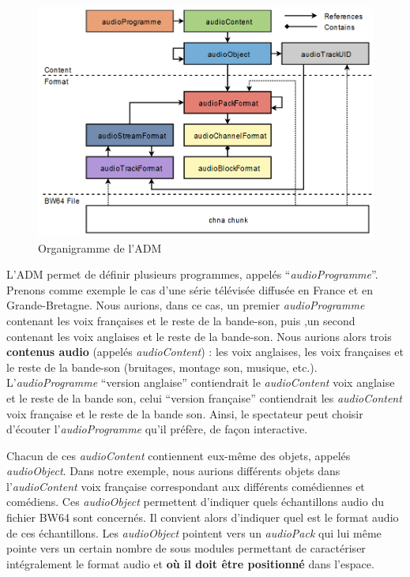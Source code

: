 \documentclass[
  letterpaper,
  DIV=11,
  numbers=noendperiod]{scrreprt}
\begin{document}
\begin{figure}

{\centering \includegraphics{spatialisation/../_resources/bitmap/adm/admStruct.png}

}

\caption{\label{fig-adm-struct}Organigramme de l'ADM}

\end{figure}

L'ADM permet de définir plusieurs programmes, appelés
``\emph{audioProgramme}''. Prenons comme exemple le cas d'une série
télévisée diffusée en France et en Grande-Bretagne. Nous aurions, dans
ce cas, un premier \emph{audioProgramme} contenant les voix françaises
et le reste de la bande-son, puis ,un second contenant les voix
anglaises et le reste de la bande-son. Nous aurions alors trois
\textbf{contenus audio} (appelés \emph{audioContent}) : les voix
anglaises, les voix françaises et le reste de la bande-son (bruitages,
montage son, musique, etc.). L'\emph{audioProgramme} ``version
anglaise'' contiendrait le \emph{audioContent} voix anglaise et le reste
de la bande son, celui ``version française'' contiendrait les
\emph{audioContent} voix française et le reste de la bande son. Ainsi,
le spectateur peut choisir d'écouter l'\emph{audioProgramme} qu'il
préfère, de façon interactive.

Chacun de ces \emph{audioContent} contiennent eux-même des objets,
appelés \emph{audioObject}. Dans notre exemple, nous aurions différents
objets dans l'\emph{audioContent} voix française correspondant aux
différents comédiennes et comédiens. Ces \emph{audioObject} permettent
d'indiquer quels échantillons audio du fichier BW64 sont concernés. Il
convient alors d'indiquer quel est le format audio de ces échantillons.
Les \emph{audioObject} pointent vers un \emph{audioPack} qui lui même
pointe vers un certain nombre de sous modules permettant de caractériser
intégralement le format audio et \textbf{où il doit être positionné}
dans l'espace.
\end{document}
